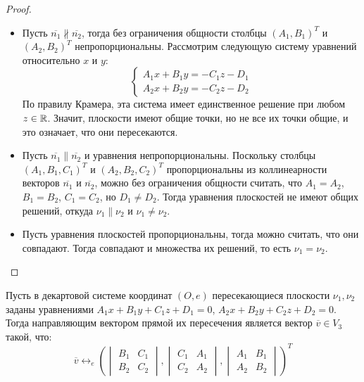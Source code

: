 \begin{proof}~
	\begin{itemize}
		\item Пусть $\overline{n_1} \nparallel \overline{n_2}$, тогда без ограничения общности столбцы $(A_1, B_1)^T$ и $(A_2, B_2)^T$ непропорциональны. Рассмотрим следующую систему уравнений относительно $x$ и $y$:
		\[\left\{
		\begin{aligned}
		A_1x + B_1y = -C_1z -D_1\\
		A_2x + B_2y = -C_2z -D_2
		\end{aligned}
		\right.
		\]
		По правилу Крамера, эта система имеет единственное решение при любом $z \in \mathbb{R}$. Значит, плоскости имеют общие точки, но не все их точки общие, и это означает, что они пересекаются.
		
		\item Пусть $\overline{n_1} \parallel \overline{n_2}$ и уравнения непропорциональны. Поскольку столбцы $(A_1, B_1, C_1)^T$ и $(A_2, B_2, C_2)^T$ пропорциональны из коллинеарности векторов $\overline{n_1}$ и $\overline{n_2}$, можно без ограничения общности считать, что $A_1 = A_2$, $B_1 = B_2$, $C_1 = C_2$, но $D_1 \ne D_2$. Тогда уравнения плоскостей не имеют общих решений, откуда $\nu_1 \parallel \nu_2 \text{ и } \nu_1 \ne \nu_2$.
		
		\item Пусть уравнения плоскостей пропорциональны, тогда можно считать, что они совпадают. Тогда совпадают и множества их решений, то есть $\nu_1 = \nu_2$.\qedhere
	\end{itemize}
\end{proof}

\begin{proposition}
	Пусть в декартовой системе координат $(O, e)$ пересекающиеся плоскости $\nu_1, \nu_2$ заданы уравнениями $A_1x+B_1y+C_1z+D_1 = 0$, $A_2x+B_2y+C_2z+D_2 = 0$. Тогда направляющим вектором прямой их пересечения является вектор $\overline v \in V_3$ такой, что:
	\[\overline{v} \leftrightarrow_{e} \left(
	\begin{vmatrix}
	B_1&C_1\\
	B_2&C_2
	\end{vmatrix}, \begin{vmatrix}
	C_1&A_1\\
	C_2&A_2
	\end{vmatrix}, \begin{vmatrix}
	A_1&B_1\\
	A_2&B_2
	\end{vmatrix}\right)^T\]
\end{proposition}

